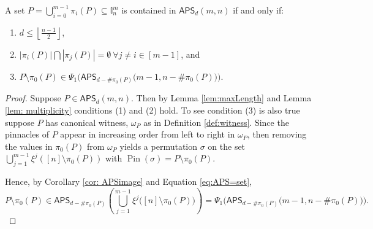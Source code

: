 \documentclass[10pt,a4paper]{amsart}
\newcommand\APS{\mathsf{APS}}
\newcommand{\I}{\mathbb{I}}
\newcommand{\Pin}{\operatorname{Pin}}
\newcommand{\floor}[1]{\left\lfloor#1\right\rfloor}
\begin{document}
\begin{theorem}\label{thm: pinCharacter}
    A set $P=\bigcup_{i=0}^{m-1}\pi_i(P) \subseteq \I_n^m$ is contained in $\APS_d(m,n)$ 
    if and only if:
    \begin{enumerate}
        \item $d\leq \floor{\frac{n-1}{2}}$,
        \item $|\pi_i(P)| \bigcap |\pi_j(P)| =  \emptyset  \ \forall j \neq i \in [m-1]$, and
    \item[(3)] $P\setminus \pi_0(P) \in \Psi_1\Big(\APS_{d-\#\pi_0(P)}\Big(m-1,n-\#\pi_0(P)\Big)\Big)$.
    \end{enumerate}
\end{theorem}

\begin{proof}
Suppose $P \in \APS_d(m,n)$. Then by Lemma \ref{lem:maxLength} and Lemma \ref{lem: multiplicity} conditions (1) and (2) hold. 
To see condition (3) is also true suppose $P$ has canonical witness, $\omega_P$ as in Definition \ref{def:witness}. Since the pinnacles of $P$ appear in increasing order from left to right in $\omega_P$, then removing the values in $\pi_0(P)$ from $\omega_P$ yields a permutation $\sigma$ on the set $\bigcup_{j=1}^{m-1} \xi^{j}([n]\setminus \pi_0(P))$ with $\Pin(\sigma)=P\setminus \pi_0(P)$.

Hence, by Corollary \ref{cor: APSimage} and Equation \ref{eq:APS=set},
\[P\setminus \pi_0(P) \in \APS_{d-\#\pi_0(P)}\left( \bigcup_{j=1}^{m-1} \xi^{j}\Big([n]\setminus \pi_0(P)\Big)\right)=\Psi_1\Big(\APS_{d-\#\pi_0(P)}\Big(m-1,n-\#\pi_0(P)\Big)\Big).\]


\end{proof}
\end{document}
